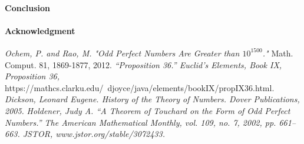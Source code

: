 \documentclass[12pt]{article}
\begin{document}
\paragraph*{Conclusion}

\paragraph*{Acknowledgment}


\begin{thebibliography}{5}
\textit{Ochem, P. and Rao, M. "Odd Perfect Numbers Are Greater than $10^{1500}$."} Math. Comput. 81, 1869-1877, 2012.
\textit{“Proposition 36.” Euclid's Elements, Book IX, Proposition 36,} https://mathcs.clarku.edu/~djoyce/java/elements/bookIX/propIX36.html.
\textit{Dickson, Leonard Eugene. History of the Theory of Numbers. Dover Publications, 2005.}
\textit{Holdener, Judy A. “A Theorem of Touchard on the Form of Odd Perfect Numbers.” The American Mathematical Monthly, vol. 109, no. 7, 2002, pp. 661–663. JSTOR, www.jstor.org/stable/3072433.}
\end{thebibliography}
\end{document}
